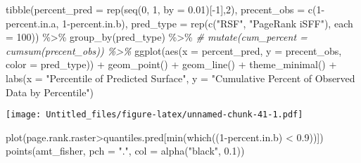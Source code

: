 \documentclass[
]{article}
\newenvironment{Shaded}{\begin{snugshade}}{\end{snugshade}}
\newcommand{\AttributeTok}[1]{\textcolor[rgb]{0.77,0.63,0.00}{#1}}
\newcommand{\CommentTok}[1]{\textcolor[rgb]{0.56,0.35,0.01}{\textit{#1}}}
\newcommand{\DecValTok}[1]{\textcolor[rgb]{0.00,0.00,0.81}{#1}}
\newcommand{\FloatTok}[1]{\textcolor[rgb]{0.00,0.00,0.81}{#1}}
\newcommand{\FunctionTok}[1]{\textcolor[rgb]{0.00,0.00,0.00}{#1}}
\newcommand{\NormalTok}[1]{#1}
\newcommand{\SpecialCharTok}[1]{\textcolor[rgb]{0.00,0.00,0.00}{#1}}
\newcommand{\StringTok}[1]{\textcolor[rgb]{0.31,0.60,0.02}{#1}}
\begin{document}
\begin{Shaded}
\begin{Highlighting}[]
\FunctionTok{tibble}\NormalTok{(}\AttributeTok{percent\_pred =} \FunctionTok{rep}\NormalTok{(}\FunctionTok{seq}\NormalTok{(}\DecValTok{0}\NormalTok{, }\DecValTok{1}\NormalTok{, }\AttributeTok{by =} \FloatTok{0.01}\NormalTok{)[}\SpecialCharTok{{-}}\DecValTok{1}\NormalTok{],}\DecValTok{2}\NormalTok{),}
       \AttributeTok{precent\_obs =} \FunctionTok{c}\NormalTok{(}\DecValTok{1}\SpecialCharTok{{-}}\NormalTok{percent.in.a,}
                       \DecValTok{1}\SpecialCharTok{{-}}\NormalTok{percent.in.b),}
       \AttributeTok{pred\_type =} \FunctionTok{rep}\NormalTok{(}\FunctionTok{c}\NormalTok{(}\StringTok{"RSF"}\NormalTok{, }\StringTok{"PageRank iSFF"}\NormalTok{), }
                       \AttributeTok{each =} \DecValTok{100}\NormalTok{)) }\SpecialCharTok{\%\textgreater{}\%} 
  \FunctionTok{group\_by}\NormalTok{(pred\_type) }\SpecialCharTok{\%\textgreater{}\%} 
  \CommentTok{\# mutate(cum\_percent = cumsum(precent\_obs)) \%\textgreater{}\% }
  \FunctionTok{ggplot}\NormalTok{(}\FunctionTok{aes}\NormalTok{(}\AttributeTok{x =}\NormalTok{ percent\_pred, }\AttributeTok{y =}\NormalTok{ precent\_obs, }\AttributeTok{color =}\NormalTok{ pred\_type)) }\SpecialCharTok{+}
  \FunctionTok{geom\_point}\NormalTok{() }\SpecialCharTok{+}
  \FunctionTok{geom\_line}\NormalTok{() }\SpecialCharTok{+}
  \FunctionTok{theme\_minimal}\NormalTok{() }\SpecialCharTok{+}
  \FunctionTok{labs}\NormalTok{(}\AttributeTok{x =} \StringTok{"Percentile of Predicted Surface"}\NormalTok{,}
       \AttributeTok{y =} \StringTok{"Cumulative Percent of Observed Data by Percentile"}\NormalTok{)}
\end{Highlighting}
\end{Shaded}

\texttt{[image: Untitled\_files/figure-latex/unnamed-chunk-41-1.pdf]}

\begin{Shaded}
\begin{Highlighting}[]
\FunctionTok{plot}\NormalTok{(page.rank.raster}\SpecialCharTok{\textgreater{}}\NormalTok{quantiles.pred[}\FunctionTok{min}\NormalTok{(}\FunctionTok{which}\NormalTok{((}\DecValTok{1}\SpecialCharTok{{-}}\NormalTok{percent.in.b) }\SpecialCharTok{\textless{}} \FloatTok{0.9}\NormalTok{))])}
\FunctionTok{points}\NormalTok{(amt\_fisher, }\AttributeTok{pch =} \StringTok{"."}\NormalTok{, }\AttributeTok{col =} \FunctionTok{alpha}\NormalTok{(}\StringTok{"black"}\NormalTok{, }\FloatTok{0.1}\NormalTok{))}
\end{Highlighting}
\end{Shaded}
\end{document}
